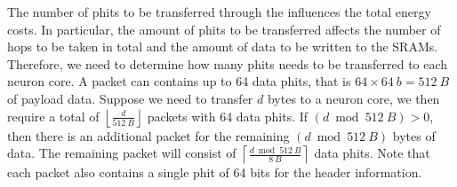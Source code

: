 The number of phits to be transferred through the \confignoc{} influences the total energy costs.
In particular, the amount of phits to be transferred affects the number of hops to be taken in total and the amount of data to be written to the SRAMs.
Therefore, we need to determine how many phits needs to be transferred to each neuron core.
A packet can contains up to 64 data phits, that is $64 \times \SI{64}{b} = \SI{512}{B}$ of payload data.
Suppose we need to transfer $d$ bytes to a neuron core, we then require a total of $\left\lfloor \frac{d}{\SI{512}{B}} \right\rfloor$ packets with 64 data phits.
If $\left( d \bmod \SI{512}{B} \right) > 0$, then there is an additional packet for the remaining $\left( d \bmod \SI{512}{B} \right)$ bytes of data.
The remaining packet will consist of $\left\lceil \frac{d \bmod \SI{512}{B}}{\SI{8}{B}}\right\rceil$ data phits.
Note that each packet also contains a single phit of 64 bits for the header information.




